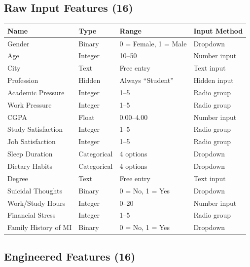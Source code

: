 \documentclass[11pt,a4paper]{article}
\begin{document}
\subsection{Raw Input Features (16)}

\renewcommand{\arraystretch}{1.2}
\begin{longtable}{p{3.5cm}p{2.5cm}p{2.5cm}p{5cm}}
\hline
\textbf{Name} & \textbf{Type} & \textbf{Range} & \textbf{Input Method} \\
\hline
Gender & Binary & 0 = Female, 1 = Male & Dropdown \\
Age & Integer & 10--50 & Number input \\
City & Text & Free entry & Text input \\
Profession & Hidden & Always ``Student'' & Hidden input \\
Academic Pressure & Integer & 1--5 & Radio group \\
Work Pressure & Integer & 1--5 & Radio group \\
CGPA & Float & 0.00--4.00 & Number input \\
Study Satisfaction & Integer & 1--5 & Radio group \\
Job Satisfaction & Integer & 1--5 & Radio group \\
Sleep Duration & Categorical & 4 options & Dropdown \\
Dietary Habits & Categorical & 4 options & Dropdown \\
Degree & Text & Free entry & Text input \\
Suicidal Thoughts & Binary & 0 = No, 1 = Yes & Dropdown \\
Work/Study Hours & Integer & 0--20 & Number input \\
Financial Stress & Integer & 1--5 & Radio group \\
Family History of MI & Binary & 0 = No, 1 = Yes & Dropdown \\
\hline
\end{longtable}

\subsection{Engineered Features (16)}
\end{document}
